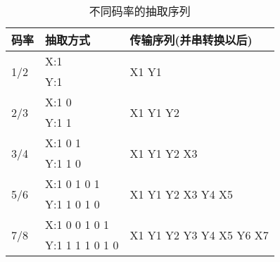 \begin{table}[!hbp]
	\centering
	\caption{不同码率的抽取序列}
	\begin{tabular}{|l|l|l|}
	\hline
	码率 & 抽取方式 & 传输序列(并串转换以后) \\
	\hline
	\multirow{2}{*}{1/2} & X:1 & \multirow{2}{*}{X1 Y1} \\
	\cline{2-2}
		& Y:1 & \\
	\hline
	\multirow{2}{*}{2/3} & X:1 0 & \multirow{2}{*}{X1 Y1 Y2} \\
	\cline{2-2}
		& Y:1 1 & \\
	\hline
	\multirow{2}{*}{3/4} & X:1 0 1 & \multirow{2}{*}{X1 Y1 Y2 X3} \\
	\cline{2-2}
		& Y:1 1 0 & \\
	\hline
	\multirow{2}{*}{5/6} & X:1 0 1 0 1 & \multirow{2}{*}{X1 Y1 Y2 X3 Y4 X5} \\
	\cline{2-2}
		& Y:1 1 0 1 0 & \\
	\hline
	\multirow{2}{*}{7/8} & X:1 0 0 1 0 1 & \multirow{2}{*}{X1 Y1 Y2 Y3 Y4 X5 Y6 X7} \\
	\cline{2-2}
		& Y:1 1 1 1 0 1 0 & \\
	\hline
	\end{tabular}
	\label{table:inner_coder_slash}
\end{table}
\endinput